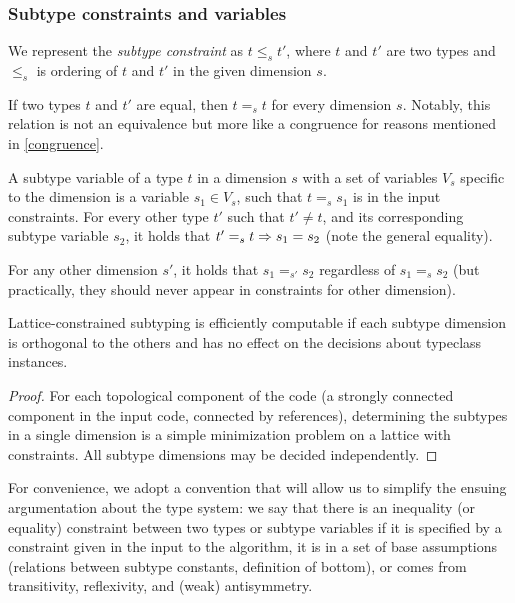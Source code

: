 \subsubsection{Subtype constraints and variables}

We represent the \emph{subtype constraint} as $t \leq_s t'$, where $t$ and $t'$ are two types and $\leq_s$ is ordering of $t$ and $t'$ in the given dimension $s$.

If two types $t$ and $t'$ are equal, then $t =_s t$ for every dimension $s$. Notably, this relation is not an equivalence but more like a congruence for reasons mentioned in \cref{congruence}.

\begin{defn}
    A subtype variable of a type $t$ in a dimension $s$ with a set of variables $V_s$ specific to the dimension is a variable $s_1 \in V_s$, such that $t =_s s_1$ is in the input constraints. For every other type $t'$ such that $t' \neq t$, and its corresponding subtype variable $s_2$, it holds that $t' =_s t \Rightarrow s_1 = s_2$ (note the general equality).
\end{defn}

For any other dimension $s'$, it holds that $s_1 =_{s'} s_2$ regardless of $s_1 =_s s_2$ (but practically, they should never appear in constraints for other dimension).

\begin{observe}
    Lattice-constrained subtyping is efficiently computable if each subtype dimension is orthogonal to the others and has no effect on the decisions about typeclass instances.

    \begin{proof}
        For each topological component of the code (a strongly connected component in the input code, connected by references), determining the subtypes in a single dimension is a simple minimization problem on a lattice with constraints. All subtype dimensions may be decided independently.
    \end{proof}
\end{observe}

\begin{conv}
    For convenience, we adopt a convention that will allow us to simplify the ensuing argumentation about the type system: we say that there is an inequality (or equality) constraint between two types or subtype variables if it is specified by a constraint given in the input to the algorithm, it is in a set of base assumptions (relations between subtype constants, definition of bottom), or comes from transitivity, reflexivity, and (weak) antisymmetry.
\end{conv}

